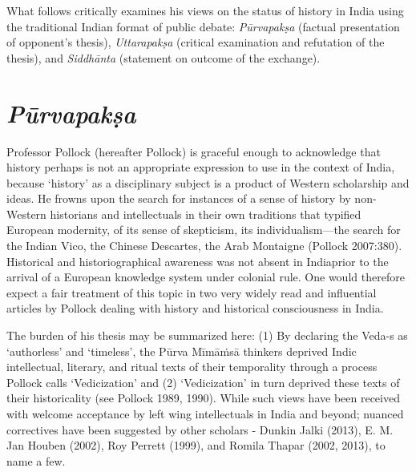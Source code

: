 What follows critically examines his views on the status of history in India using the traditional Indian format of public debate: \textit{Pūrvapakṣa} (factual presentation of opponent’s thesis), \textit{Uttarapakṣa} (critical examination and refutation of the thesis), and \textit{Siddhānta} (statement on outcome of the exchange).


\section*{\textit{Pūrvapakṣa}}

Professor Pollock (hereafter Pollock) is graceful enough to acknowledge that history perhaps is not an appropriate expression to use in the context of India, because ‘history’ as a disciplinary subject is a product of Western scholarship and ideas. He frowns upon the search for instances of a sense of history by non-Western historians and intellectuals in their own traditions that typified European modernity, of its sense of skepticism, its individualism—the search for the Indian Vico, the Chinese Descartes, the Arab Montaigne (Pollock 2007:380). Historical and historiographical awareness was not absent in India\break prior to the arrival of a European knowledge system under colonial rule. One would therefore expect a fair treatment of this topic in two very widely read and influential articles by Pollock dealing with history and historical consciousness in India.

The burden of his thesis may be summarized here: (1) By declaring the Veda-s as ‘authorless’ and ‘timeless’, the Pūrva Mīmāṁsā thinkers deprived Indic intellectual, literary, and ritual texts of their temporality through a process Pollock calls ‘Vedicization’ and (2) ‘Vedicization’ in turn deprived these texts of their historicality (see Pollock 1989, 1990). While such views have been received with welcome acceptance by left wing intellectuals in India and beyond; nuanced correctives have been suggested by other scholars - Dunkin Jalki (2013), E. M. Jan Houben (2002), Roy Perrett (1999), and Romila Thapar (2002, 2013), to name a few.

